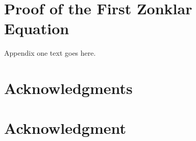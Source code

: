 \documentclass[10pt,journal,compsoc]{IEEEtran}
\begin{document}
\cite{Wang2017}
\cite{Taylor2018}
\cite{Shen2017}


%


\appendices
\section{Proof of the First Zonklar Equation}
Appendix one text goes here.



\ifCLASSOPTIONcompsoc
  \section*{Acknowledgments}
\else
  \section*{Acknowledgment}
\fi
\end{document}
